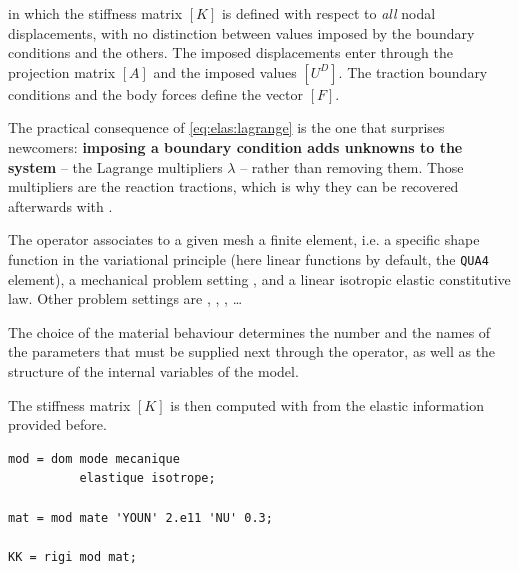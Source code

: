 \noindent in which the stiffness matrix $[K]$ is defined with respect to
\emph{all} nodal displacements, with no distinction between values imposed by
the boundary conditions and the others. The imposed displacements enter
through the projection matrix $[A]$ and the imposed values $[U^{D}]$. The
traction boundary conditions and the body forces define the vector $[F]$.

The practical consequence of \eqref{eq:elas:lagrange} is the one that
surprises newcomers: \textbf{imposing a boundary condition adds unknowns to
the system} -- the Lagrange multipliers $\lambda$ -- rather than removing
them. Those multipliers are the reaction tractions, which is why they can be
recovered afterwards with .

\begin{castemcom}
The   operator associates to a given mesh
a finite element, i.e. a specific shape function in the variational principle
(here linear functions by default, the \texttt{QUA4} element), a mechanical
problem setting , and a linear isotropic elastic constitutive
law. Other problem settings are , , ,
\ldots

The choice of the material behaviour determines the number and the names of
the parameters that must be supplied next through the 
 operator, as well as the structure of the
internal variables of the model.

The stiffness matrix $[K]$ is then computed with 
 from the elastic information provided before.
\end{castemcom}
\begin{castemlines}
\begin{verbatim}
mod = dom mode mecanique
          elastique isotrope;

mat = mod mate 'YOUN' 2.e11 'NU' 0.3;

KK = rigi mod mat;
\end{verbatim}
\end{castemlines}

